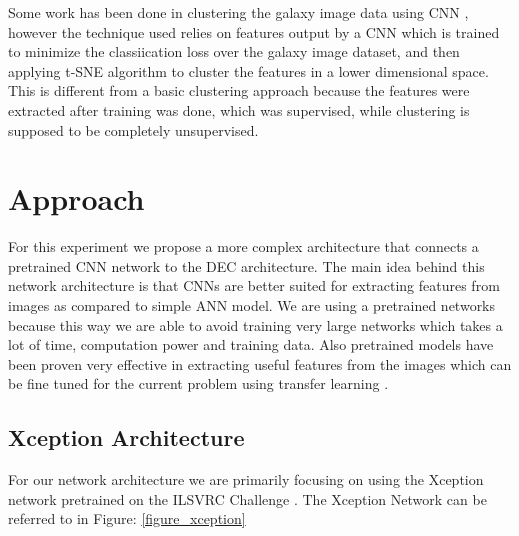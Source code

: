 \documentclass{article}
\begin{document}
Some work has been done in clustering the galaxy image data using CNN \cite{khan}, however the technique used relies on features output by a CNN which is trained to minimize the classiication loss over the galaxy image dataset, and then applying t-SNE algorithm \cite{tsne} to cluster the features in a lower dimensional space. This is different from a basic clustering approach because the features were extracted after training was done, which was supervised, while clustering is supposed to be completely unsupervised. 

















\section{Approach}

For this experiment we propose a more complex architecture that connects a pretrained CNN network to the DEC architecture. The main idea behind this network architecture is that CNNs are better suited for extracting features from images as compared to simple ANN model. We are using a pretrained networks because this way we are able to avoid training very large networks which takes a lot of time, computation power and training data. Also pretrained models have been proven very effective in extracting useful features from the images which can be fine tuned for the current problem using transfer learning \cite{transfer_learning}. 


\subsection{Xception Architecture}
For our network architecture we are primarily focusing on using the Xception \cite{xception} network pretrained on the ILSVRC Challenge \cite{imagenet}. The Xception Network can be referred to in Figure: \ref{figure_xception}
\end{document}
